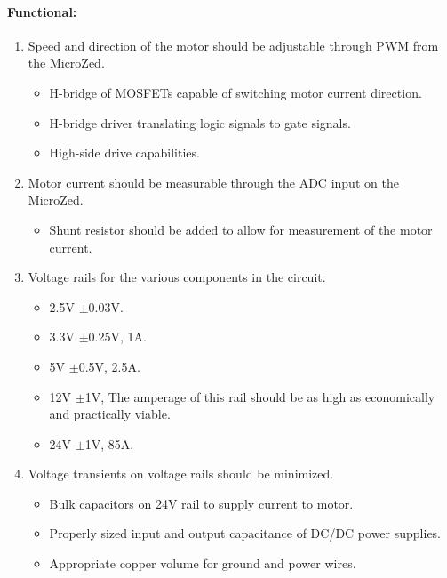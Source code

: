 \paragraph{Functional:}
\begin{enumerate}[resume]
	\item Speed and direction of the motor should be adjustable through PWM from the MicroZed.
	\label{enum:motor_speed_direction}
	\begin{itemize}
		\item H-bridge of MOSFETs capable of switching motor current direction.
		\item H-bridge driver translating logic signals to gate signals.
		\item High-side drive capabilities.
	\end{itemize}

	\item Motor current should be measurable through the ADC input on the MicroZed.
	\label{enum:motor_current}
	\begin{itemize}
		\item Shunt resistor should be added to allow for measurement of the motor current.
	\end{itemize}

	\item Voltage rails for the various components in the circuit.
	\label{enum:voltage_rails}	
	\begin{itemize}
		\item 2.5V $\pm$0.03V.
		\item 3.3V $\pm$0.25V, 1A.
		\item 5V $\pm$0.5V, 2.5A.
		\item 12V $\pm$1V, The amperage of this rail should be as high as economically and practically viable.
		\item 24V $\pm$1V, 85A.
	\end{itemize}

	\item Voltage transients on voltage rails should be minimized.
	\label{enum:voltage_transients}	
	\begin{itemize}
		\item Bulk capacitors on 24V rail to supply current to motor.
		\item Properly sized input and output capacitance of DC/DC power supplies.
		\item Appropriate copper volume for ground and power wires.
	\end{itemize}


\end{enumerate}
